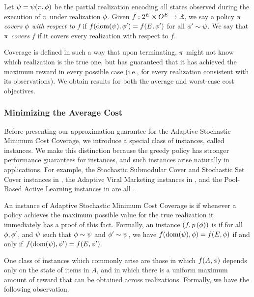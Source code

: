 \begin{definition}[Coverage]\label{def:coverage}
Let ${\color{black}{\ensuremath{\psi}}} = {\color{black}{\ensuremath{\psi}}}(\pi, {\color{black}{\ensuremath{\phi}}})$ be the partial realization encoding all
 states observed during the execution of $\pi$ under realization
 ${\color{black}{\ensuremath{\phi}}}$.
Given $f:2^{E} \times O^{E} \to
\mathbb{R}$, we say a policy 
$\pi$ \emph{covers} ${\color{black}{\ensuremath{\phi}}}$ \emph{with respect to} $f$
if
$f(\operatorname{dom}({\color{black}{\ensuremath{\psi}}}), {\color{black}{\ensuremath{\phi}}}') = f(E, {\color{black}{\ensuremath{\phi}}}')$
for all ${\color{black}{\ensuremath{\phi}}}' \sim {\color{black}{\ensuremath{\psi}}}$.
We say that $\pi$ \emph{covers} $f$ if it covers every realization
with respect to $f$.
\end{definition}

Coverage is defined in such a way that upon terminating, 
$\pi$ might not know which realization 
is the true one, but has
guaranteed that it has achieved the maximum reward in every possible
case (i.e., for every realization consistent with its observations).  We obtain results for both the average and worst-case cost objectives.

\subsubsection{Minimizing the Average Cost}

Before presenting our approximation guarantee for the Adaptive Stochastic Minimum Cost Coverage, 
we introduce a special class of instances, called \emph{\certifying} instances.
We make this distinction because 
the greedy policy has stronger performance guarantees for 
\certifying instances, and such instances arise naturally in 
applications.  
For example, the Stochastic Submodular Cover and Stochastic Set Cover
instances in , the Adaptive Viral Marketing instances in 
, and the Pool-Based Active Learning instances
in  are all \certifying.

\begin{definition}
An instance of Adaptive Stochastic Minimum Cost Coverage is
\emph{\certifying} if whenever a policy achieves the maximum possible
value for the true realization it immediately has a proof of this
fact.
Formally, an instance $(f, {\color{black}{\ensuremath{p \left( {{\color{black}{\ensuremath{\phi}}}} \right) }}})$ is \certifying if 
for all ${\color{black}{\ensuremath{\phi}}}, {\color{black}{\ensuremath{\phi}}}'$, and ${\color{black}{\ensuremath{\psi}}}$ such that ${\color{black}{\ensuremath{\phi}}} \sim {\color{black}{\ensuremath{\psi}}}$ and ${\color{black}{\ensuremath{\phi}}}'
\sim {\color{black}{\ensuremath{\psi}}}$, we have 
$f(\operatorname{dom}({\color{black}{\ensuremath{\psi}}}), {\color{black}{\ensuremath{\phi}}}) = f(E, {\color{black}{\ensuremath{\phi}}})$ if and only if 
$f(\operatorname{dom}({\color{black}{\ensuremath{\psi}}}), {\color{black}{\ensuremath{\phi}}}') = f(E, {\color{black}{\ensuremath{\phi}}}')$.
\end{definition}

One class of \certifying instances which commonly arise are those in which 
$f(A, {\color{black}{\ensuremath{\phi}}})$ depends only on the state of items in $A$, and in which
there is a uniform maximum amount of reward that can be obtained
across realizations. 
Formally, we have the following observation.

